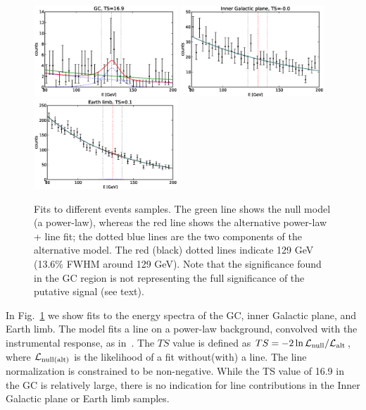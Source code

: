 \documentclass[aps,twocolumn,prd,superscriptaddress,showpacs,nofootinbib,fixfloat]{revtex4}
\begin{document}
\begin{figure}
  \centering
  \includegraphics[width=0.48\textwidth]{plots/counts_GC.eps}
  \includegraphics[width=0.48\textwidth]{plots/counts_IGP.eps}
  \includegraphics[width=0.48\textwidth]{plots/counts_limb.eps}
  \caption{Fits to different events samples. The green line
  shows the null model (a power-law), whereas the red line
  shows the alternative power-law + line fit; the dotted
  blue lines are the two components of the alternative
  model. The red (black) dotted lines indicate 129 GeV
  (13.6\% FWHM around 129 GeV). 
  Note that the significance found in the GC region is not representing
  the full significance of the putative signal (see text).}
  \label{fig:spectra1}
\end{figure}

In Fig.~\ref{fig:spectra1} we show fits to the energy
spectra of the GC, inner Galactic plane, and Earth limb.  The model fits a
line on a power-law background, convolved with the instrumental response, as
in~\cite{Weniger:2012}. The $TS$ value
is defined as $TS=-2\ln \mathcal{L}_{\rm
null}/\mathcal{L}_{\rm alt}$, where $\mathcal{L}_{\rm
null(alt)}$ is the likelihood of a fit without(with) a line.  The line
normalization is constrained to be non-negative. While the TS value of 16.9 in
the GC is relatively large, there is no indication for line contributions in
the Inner Galactic plane or Earth limb samples.
\end{document}
